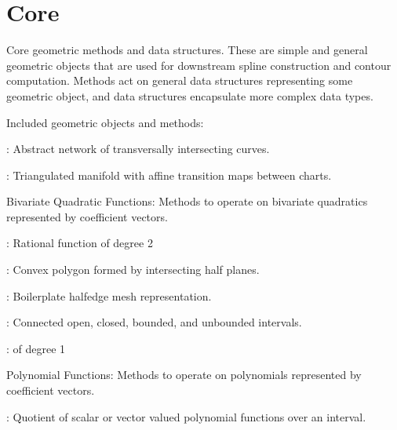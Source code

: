 \chapter{Core}
\hypertarget{md_src_2core_2_r_e_a_d_m_e}{}\label{md_src_2core_2_r_e_a_d_m_e}
\label{md_src_2core_2_r_e_a_d_m_e_autotoc_md1}%
%
 Core geometric methods and data structures. These are simple and general geometric objects that are used for downstream spline construction and contour computation. Methods act on general data structures representing some geometric object, and data structures encapsulate more complex data types.

Included geometric objects and methods\+:


\begin{DoxyItemize}
\item {\ttfamily {}}\+: Abstract network of transversally intersecting curves.
\item {\ttfamily {}}\+: Triangulated manifold with affine transition maps between charts.
\item {\ttfamily Bivariate Quadratic Functions}\+: Methods to operate on bivariate quadratics represented by coefficient vectors.
\item {\ttfamily {}}\+: Rational function of degree 2
\item {\ttfamily {}}\+: Convex polygon formed by intersecting half planes.
\item {\ttfamily {}}\+: Boilerplate halfedge mesh representation.
\item {\ttfamily {}}\+: Connected open, closed, bounded, and unbounded intervals.
\item {\ttfamily {}}\+:  of degree 1
\item {\ttfamily Polynomial Functions}\+: Methods to operate on polynomials represented by coefficient vectors.
\item {\ttfamily {}}\+: Quotient of scalar or vector valued polynomial functions over an interval. 
\end{DoxyItemize}